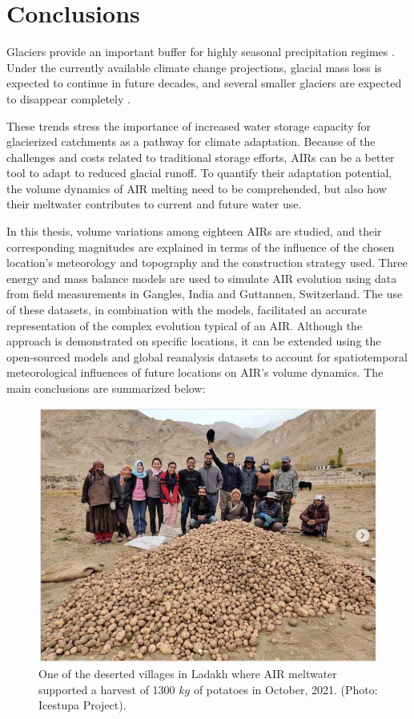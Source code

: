 \section{Conclusions}

Glaciers provide an important buffer for highly seasonal precipitation regimes
\citep{kaserContributionPotentialGlaciers2010}. Under the currently available 
climate change projections, glacial mass loss is expected to continue in future decades, and several smaller 
glaciers are expected to disappear completely \citep{rabatelCurrentStateGlaciers2013}.

These trends stress the importance of increased water storage capacity for glacierized catchments as a pathway
for climate adaptation. Because of the challenges and costs related to traditional storage efforts, \ac{AIRs} can
be a better tool to adapt to reduced glacial runoff. To quantify their adaptation potential, the volume dynamics 
of \ac{AIR} melting need to be comprehended, but also how their meltwater contributes to
current and future water use. 

In this thesis, volume variations among eighteen \ac{AIRs} are studied, and their corresponding magnitudes
are explained in terms of the influence of the chosen location's meteorology and topography and the construction
strategy used. Three energy and mass balance models are used to simulate \ac{AIR} evolution using data from field
measurements in Gangles, India and Guttannen, Switzerland. The use of these datasets, in combination with the
models, facilitated an accurate representation of the complex evolution typical of an \ac{AIR}. Although the
approach is demonstrated on specific locations, it can be extended using the open-sourced models and global
reanalysis datasets to account for spatiotemporal meteorological influences of future locations on \ac{AIR}'s
volume dynamics. The main conclusions are summarized below:

\begin{figure}[htb]
  \centering
	\includegraphics[width=8 cm]{figs/Kullum_potatoes}
	\caption{One of the deserted villages in Ladakh where \ac{AIR} meltwater supported a harvest of 1300 $kg$ of
		potatoes in October, 2021. (Photo: Icestupa Project).}
	\label{fig:kullum_potatoes}
\end{figure}

